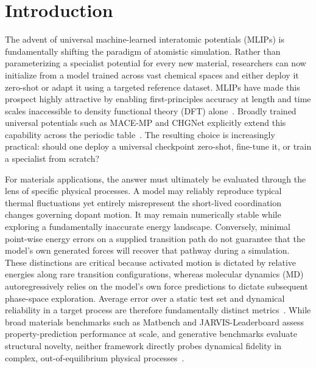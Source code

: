 \documentclass[pdflatex,sn-mathphys-num]{sn-jnl}
\begin{document}
\section{Introduction}\label{sec:introduction}
The advent of universal machine-learned interatomic potentials (MLIPs) is fundamentally shifting the paradigm of atomistic simulation. Rather than parameterizing a specialist potential for every new material, researchers can now initialize from a model trained across vast chemical spaces and either deploy it zero-shot or adapt it using a targeted reference dataset. MLIPs have made this prospect highly attractive by enabling first-principles accuracy at length and time scales inaccessible to density functional theory (DFT) alone~\citep{unke_machine_2021,bartok_gaussian_2010,ssmith_ani-1_2017,chen_accurate_2017,lindsey2017chimes,zhang_deep_2018,chmiela_sgdml_2017,batzner_e3-equivariant_2022,musaelian_learning_2023,zeng_deepmd-kit_2023,vandermause_active_2022,batatia_mace_nodate,wines_chips-ff_2025,friederich_machine-learned_2021}. Broadly trained universal potentials such as MACE-MP and CHGNet explicitly extend this capability across the periodic table~\citep{batatia_mace_foundation_2025,deng_chgnet_2023,chen_graph_2019,chen_universal_2022,yang_mattersim_2024,wood_uma_2025,merchant_scaling_2023}. The resulting choice is increasingly practical: should one deploy a universal checkpoint zero-shot, fine-tune it, or train a specialist from scratch?

For materials applications, the answer must ultimately be evaluated through the lens of specific physical processes. A model may reliably reproduce typical thermal fluctuations yet entirely misrepresent the short-lived coordination changes governing dopant motion. It may remain numerically stable while exploring a fundamentally inaccurate energy landscape. Conversely, minimal point-wise energy errors on a supplied transition path do not guarantee that the model's own generated forces will recover that pathway during a simulation. These distinctions are critical because activated motion is dictated by relative energies along rare transition configurations, whereas molecular dynamics (MD) autoregressively relies on the model's own force predictions to dictate subsequent phase-space exploration. Average error over a static test set and dynamical reliability in a target process are therefore fundamentally distinct metrics~\citep{fu2022forces,liu2023discrepancies,jacobs2025practical,schran_machine_2020,bernstein_quantifying_2019}. While broad materials benchmarks such as Matbench and JARVIS-Leaderboard assess property-prediction performance at scale, and generative benchmarks evaluate structural novelty, neither framework directly probes dynamical fidelity in complex, out-of-equilibrium physical processes~\citep{dunn_benchmarking_2020,choudhary2024jarvis,betala2025lemat}.
\end{document}
